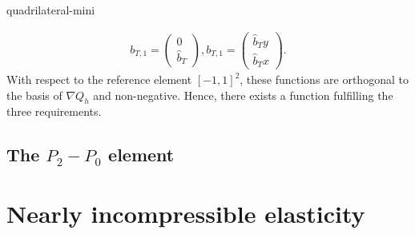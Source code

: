 \begin{Problem}{quadrilateral-mini}
\begin{solution}
\begin{align*}
    b_{T,1}= \begin{pmatrix}         0   \\ \hat{b}_T \end{pmatrix},
    b_{T,1}= \begin{pmatrix} \hat{b}_T y \\ \hat{b}_T x \end{pmatrix}.
  \end{align*}
  With respect to the reference element $[-1,1]^2$, these functions are orthogonal
  to the basis of $\nabla Q_h$ and non-negative. Hence, there exists a function
  fulfilling the three requirements.
\end{solution}
\end{Problem}


\subsection{The $P_2-P_0$ element}

\section{Nearly incompressible elasticity}

